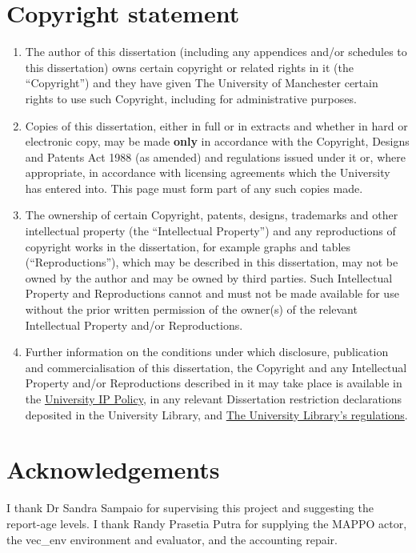 \documentclass[12pt,a4paper]{article}
\begin{document}
\section*{Copyright statement}
\begin{enumerate}
\item[(i)] The author of this dissertation (including any appendices and/or schedules to this dissertation) owns certain copyright or related rights in it (the “Copyright”) and they have given The University of Manchester certain rights to use such Copyright, including for administrative purposes.

\item[(ii)] Copies of this dissertation, either in full or in extracts and whether in hard or electronic copy, may be made \textbf{only} in accordance with the Copyright, Designs and Patents Act 1988 (as amended) and regulations issued under it or, where appropriate, in accordance with licensing agreements which the University has entered into. This page must form part of any such copies made.

\item[(iii)] The ownership of certain Copyright, patents, designs, trademarks and other intellectual property (the “Intellectual Property”) and any reproductions of copyright works in the dissertation, for example graphs and tables (“Reproductions”), which may be described in this dissertation, may not be owned by the author and may be owned by third parties. Such Intellectual Property and Reproductions cannot and must not be made available for use without the prior written permission of the owner(s) of the relevant Intellectual Property and/or Reproductions.

\item[(iv)] Further information on the conditions under which disclosure, publication and commercialisation of this dissertation, the Copyright and any Intellectual Property and/or Reproductions described in it may take place is available in the \href{http://documents.manchester.ac.uk/display.aspx?DocID=24420}{University IP Policy}, in any relevant Dissertation restriction declarations deposited in the University Library, and \href{https://www.library.manchester.ac.uk/about/regulations/}{The University Library’s regulations}.

\end{enumerate}
\section*{Acknowledgements}
I thank Dr Sandra Sampaio for supervising this project and suggesting the report-age levels. I thank Randy Prasetia Putra for supplying the MAPPO actor, the vec\_env environment and evaluator, and the accounting repair.
\clearpage
\end{document}
